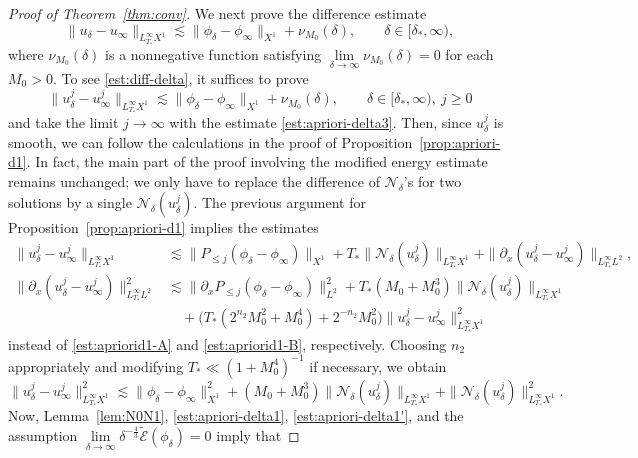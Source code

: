 \documentclass{amsart}
\numberwithin{equation}{section}
\begin{document}
\begin{proof}[Proof of Theorem~\ref{thm:conv}]
We next prove the difference estimate
\begin{equation}\label{est:diff-delta}
\| u_\delta - u_\infty \|_{L^\infty_{T_*}X^1}\lesssim \| \phi_\delta-\phi_\infty\|_{X^1} + \nu_{M_0}(\delta),\qquad \delta\in [\delta_*,\infty),
\end{equation}
where $\nu_{M_0}(\delta)$ is a nonnegative function satisfying $\lim\limits_{\delta\to\infty}\nu_{M_0}(\delta)=0$ for each $M_0>0$.
To see \eqref{est:diff-delta}, it suffices to prove
\begin{equation}\label{est:diff-delta-j}
\| u_\delta^j-u_\infty^j\|_{L^\infty_{T_*}X^1}\lesssim \| \phi_\delta-\phi_\infty\|_{X^1} + \nu_{M_0}(\delta),\qquad \delta\in [\delta_*,\infty),\ j\geq 0
\end{equation}
and take the limit $j\to \infty$ with the estimate \eqref{est:apriori-delta3}.
Then, since $u_\delta^j$ is smooth, we can follow the calculations in the proof of Proposition~\ref{prop:apriori-d1}.
In fact, the main part of the proof involving the modified energy estimate remains unchanged; we only have to replace the difference of $\mathcal{N}_\delta$'s for two solutions by a single $\mathcal{N}_\delta(u_\delta^j)$.
The previous argument for Proposition~\ref{prop:apriori-d1} implies the estimates
\begin{align*}
\| u_\delta^j-u_\infty^j\|_{L^\infty_{T_*}X^1}&\lesssim \| P_{\leq j}(\phi_\delta-\phi_\infty)\|_{X^1}+T_*\| \mathcal{N}_\delta(u_\delta^j)\|_{L^\infty_{T_*}X^1}+\| \partial_x(u_\delta^j-u_\infty^j)\|_{L^\infty_{T_*}L^2}, \\
\| \partial_x( u_\delta^j-u_\infty^j) \|_{L^\infty_{T_*}L^2}^2 &\lesssim \| \partial_xP_{\leq j}(\phi_\delta-\phi_\infty)\|_{L^2}^2 + T_*(M_0+M_0^3)\| \mathcal{N}_\delta(u_\delta^j)\|_{L^\infty_{T_*}X^1}\\
&\quad +\big(T_*(2^{n_2}M_0^2+M_0^4) + 2^{-n_2}M_0^2\big) \| u_\delta^j-u_\infty^j\|_{L^\infty_{T_*}X^1}^2 
\end{align*}
instead of \eqref{est:apriorid1-A} and \eqref{est:apriorid1-B}, respectively.
Choosing $n_2$ appropriately and modifying $T_*\ll (1+M_0^4)^{-1}$ if necessary, we obtain
\[ \| u_\delta^j-u_\infty^j\|_{L^\infty_{T_*}X^1}^2\lesssim \| \phi_\delta-\phi_\infty\|_{X^1}^2+ (M_0+M_0^3)\| \mathcal{N}_\delta(u_\delta^j)\|_{L^\infty_{T_*}X^1}+\| \mathcal{N}_\delta(u_\delta^j)\|_{L^\infty_{T_*}X^1}^2.\]
Now, Lemma~\ref{lem:N0N1}, \eqref{est:apriori-delta1}, \eqref{est:apriori-delta1'}, and the assumption $\lim\limits_{\delta\to\infty}\delta^{-\frac43}\widetilde{\mathcal{E}}(\phi_\delta)=0$ imply that

\end{proof}
\end{document}
